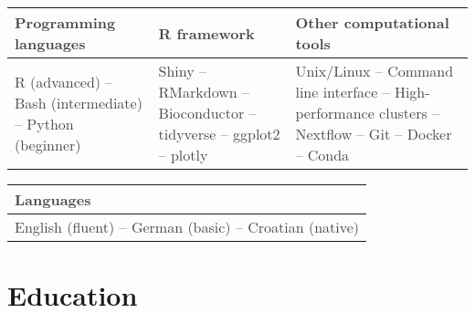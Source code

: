 \documentclass[11pt,a4paper,]{awesome-cv}
\begin{document}
\begin{cventries}
    \vspace{-4.0mm}
\end{cventries}\begin{table}[H]
\centering\begingroup\fontsize{11}{13}\selectfont

\begin{tabular}{>{\centering\arraybackslash}p{5.5cm}>{\centering\arraybackslash}p{5.5cm}>{\centering\arraybackslash}p{5.5cm}}
\toprule
\textcolor[HTML]{464646}{\textbf{Programming languages}} & \textcolor[HTML]{464646}{\textbf{R framework}} & \textcolor[HTML]{464646}{\textbf{Other computational tools}}\\
\midrule
\textcolor[HTML]{464646}{R (advanced) -- Bash (intermediate) -- Python (beginner)} & \textcolor[HTML]{464646}{Shiny -- RMarkdown -- Bioconductor -- tidyverse -- ggplot2 -- plotly} & \textcolor[HTML]{464646}{Unix/Linux -- Command line interface -- High-performance clusters -- Nextflow -- Git -- Docker -- Conda}\\
\bottomrule
\end{tabular}
\endgroup{}
\end{table}

\begin{table}[H]
\centering\begingroup\fontsize{11}{13}\selectfont

\begin{tabular}{>{\centering\arraybackslash}p{5cm}}
\toprule
\textcolor[HTML]{464646}{\textbf{Languages}}\\
\midrule
\textcolor[HTML]{464646}{English (fluent) -- German (basic) -- Croatian (native)}\\
\bottomrule
\end{tabular}
\endgroup{}
\end{table}

\pagebreak

\hypertarget{education}{%
\section{Education}\label{education}}

\begin{cventries}
    \vspace{-4.0mm}
    \vspace{-4.0mm}
    \vspace{-4.0mm}
\end{cventries}
\end{document}
